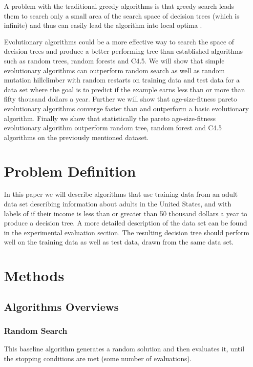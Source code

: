 \documentclass{acm_proc_article-sp}
\begin{document}
A problem with the traditional greedy algorithms is that greedy search leads them to search only a small area of the search space of decision trees (which is infinite) and thus can easily lead the algorithm into local optima \cite{barros2012}.

Evolutionary algorithms could be a more effective way to search the space of decision trees and produce a better performing tree than established algorithms such as random trees, random forests and C4.5. We will show that simple evolutionary algorithms can outperform random search as well as random mutation hillclimber with random restarts on training data and test data for a data set where the goal is to predict if the example earns less than or more than fifty thousand dollars a year. Further we will show that age-size-fitness pareto evolutionary algorithms converge faster than and outperform a basic evolutionary algorithm. Finally we show that statistically the pareto age-size-fitness evolutionary algorithm outperform random tree, random forest and C4.5 algorithms on the previously mentioned dataset.

\section{Problem Definition}

In this paper we will describe algorithms that use training data from an adult data set describing information about adults in the United States, and with labels of if their income is less than or greater than 50 thousand dollars a year to produce a decision tree. A more detailed description of the data set can be found in the experimental evaluation section. The resulting decision tree should perform well on the training data as well as test data, drawn from the same data set.

\section{Methods}

\subsection{Algorithms Overviews}

\subsubsection{Random Search}

This baseline algorithm generates a random solution and then evaluates it, until the stopping conditions are met (some number of evaluations).
\end{document}
